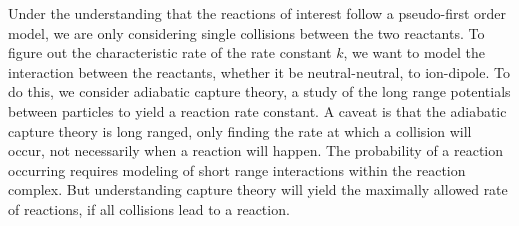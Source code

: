 Under the understanding that the reactions of interest follow a pseudo-first order model, we are only considering single collisions between the two reactants. To figure out the characteristic rate of the rate constant $k$, we want to model the interaction between the reactants, whether it be neutral-neutral, to ion-dipole. To do this, we consider adiabatic capture theory, a study of the long range potentials between particles to yield a reaction rate constant. A caveat is that the adiabatic capture theory is long ranged, only finding the rate at which a collision will occur, not necessarily when a reaction will happen. The probability of a reaction occurring requires modeling of short range interactions within the reaction complex. But understanding capture theory will yield the maximally allowed rate of reactions, if all collisions lead to a reaction.

